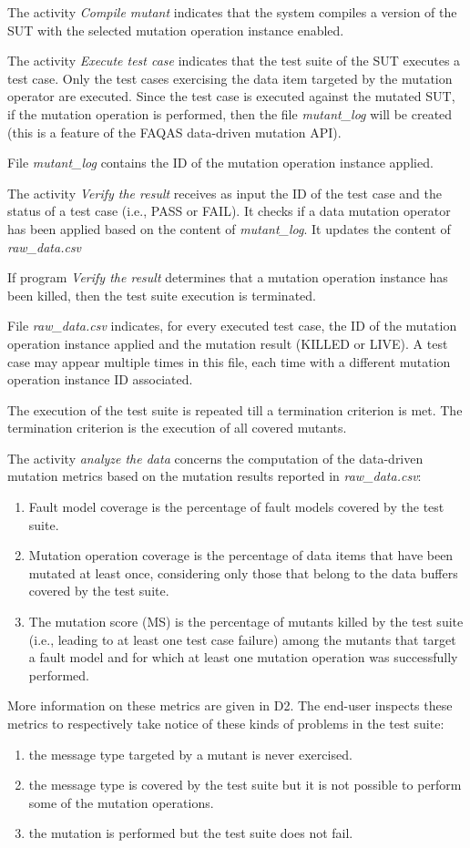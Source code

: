 The activity \emph{Compile mutant} indicates that the system compiles a version of the SUT with the selected mutation operation instance enabled.

The activity \emph{Execute test case} indicates that the test suite of the SUT executes a test case. Only the test cases exercising the data item targeted by the mutation operator are executed. Since the test case is executed against the mutated SUT, if the mutation operation is performed, then the file \emph{mutant\_log} will be created (this is a feature of the FAQAS data-driven mutation API).

File \emph{mutant\_log} contains the ID of the mutation operation instance applied.

The activity \emph{Verify the result} receives as input the ID of the test case and the status of a test case (i.e., PASS or FAIL). It checks if a data mutation operator has been applied based on the content of \emph{mutant\_log}. It updates the content of \emph{raw\_data.csv}

If program \emph{Verify the result} determines that a mutation operation instance has been killed, then the test suite execution is terminated.

File \emph{raw\_data.csv} indicates, for every executed test case, the ID of the mutation operation instance applied and the mutation result (KILLED or LIVE). A test case may appear multiple times in this file, each time with a different mutation operation instance ID associated.

The execution of the test suite is repeated till a termination criterion is met. The termination criterion is the execution of all covered mutants.

The activity \emph{analyze the data} concerns the computation of the data-driven mutation metrics based on the mutation results reported in \emph{raw\_data.csv}:
\begin{enumerate}
	\item Fault model coverage is the percentage of fault models covered by the test suite.
	\item Mutation operation coverage is the percentage of data items that have been mutated at least once, considering only those that belong to the data buffers covered by the test suite.
	\item The mutation score (MS) is the percentage of mutants killed by the test suite (i.e., leading to at least one test case failure) among the mutants that target a fault model and for which at least one mutation operation was successfully performed.
\end{enumerate}
More information on these metrics are given in D2.
The end-user inspects these metrics to respectively take notice of these kinds of problems in the test suite:
\begin{enumerate}
	\item the message type targeted by a mutant is never exercised.
	\item the message type is covered by the test suite but it is not possible to perform some of the mutation operations.
	\item the mutation is performed but the test suite does not fail.
\end{enumerate}
